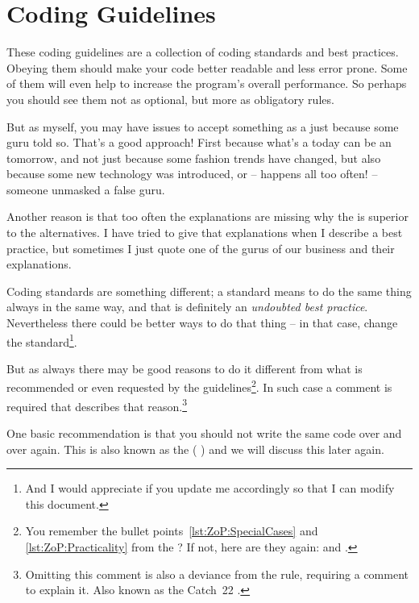 \part{Coding Guidelines}\label{sec:CodingGuidelines}
These coding guidelines are a collection of coding standards and best practices. Obeying them should make your code better readable and less error prone. Some of them will even help to increase the program's overall performance. So perhaps you should see them not as optional, but more as obligatory rules.

But as myself, you may have issues to accept something as a  just because some guru told so. That's a good approach! First because what's a  today can be an  tomorrow, and not just because some fashion trends have changed, but also because some new technology was introduced, or – happens all too often! – someone unmasked a false guru.

Another reason is that too often the explanations are missing why the  is superior to the alternatives. I have tried to give that explanations when I describe a best practice, but sometimes I just quote one of the gurus of our business and their explanations.

Coding standards are something different; a standard means to do the same thing always in the same way, and that is definitely an \textit{undoubted best practice}. Nevertheless there could be better ways to do that thing – in that case, change the standard\footnote{And I would appreciate if you update me accordingly so that I can modify this document.}.

But as always there may be good reasons to do it different from what is recommended or even requested by the guidelines\footnote{You remember the bullet points~\ref{lst:ZoP:SpecialCases} and \ref{lst:ZoP:Practicality} from the \ngref? If not, here are they again:  and .}. In such case a comment is required that describes that reason.\footnote{Omitting this comment is also a deviance from the rule, requiring a comment to explain it. Also known as the Catch~22 \autocite{WIKIPEDIA:Catch22}.}

One basic recommendation is that you should not write the same code over and over again. This is also known as the  ( \autocite{WIKIPEDIA:DRY}) and we will discuss this later again.

